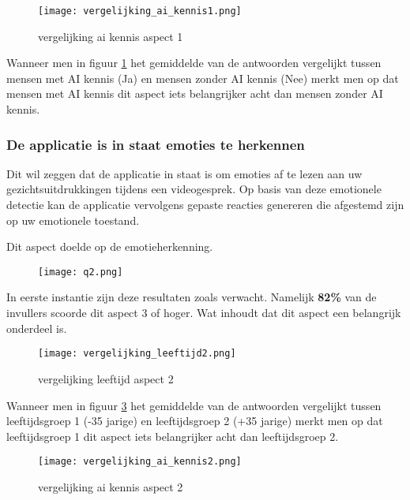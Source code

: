 \begin{figure}[htbp]
    \centering
    \texttt{[image: vergelijking\_ai\_kennis1.png]}
    \caption{vergelijking ai kennis aspect 1}
    \label{fig:vergelijking_ai_kennis1}
\end{figure}

Wanneer men in figuur \ref{fig:vergelijking_ai_kennis1} het gemiddelde van de antwoorden vergelijkt tussen mensen met AI kennis (Ja) en mensen zonder AI kennis (Nee) merkt men op dat mensen met AI kennis dit aspect iets belangrijker acht dan mensen zonder AI kennis.

\newpage

\subsubsection{De applicatie is in staat emoties te herkennen}

Dit wil zeggen  dat de applicatie in staat is om emoties af te lezen aan uw gezichtsuitdrukkingen tijdens een videogesprek. Op basis van deze emotionele detectie kan de applicatie vervolgens gepaste reacties genereren die afgestemd zijn op uw emotionele toestand.

Dit aspect doelde op de emotieherkenning.

\begin{figure}[htbp]
    \centering
    \texttt{[image: q2.png]}
    \label{fig:vraag_2_resultaat}
\end{figure}

In eerste instantie zijn deze resultaten zoals verwacht. Namelijk \textbf{82\%} van de invullers scoorde dit aspect 3 of hoger. Wat inhoudt dat dit aspect een belangrijk onderdeel is.

\begin{figure}[htbp]
    \centering
    \texttt{[image: vergelijking\_leeftijd2.png]}
    \caption{vergelijking leeftijd aspect 2}
    \label{fig:vergelijking_leeftijd2}
\end{figure}

Wanneer men in figuur \ref{fig:vergelijking_leeftijd2} het gemiddelde van de antwoorden vergelijkt tussen leeftijdsgroep 1 (-35 jarige) en leeftijdsgroep 2 (+35 jarige) merkt men op dat leeftijdsgroep 1 dit aspect iets belangrijker acht dan leeftijdsgroep 2.

\begin{figure}[htbp]
    \centering
    \texttt{[image: vergelijking\_ai\_kennis2.png]}
    \caption{vergelijking ai kennis aspect 2}
    \label{fig:vergelijking_ai_kennis2}
\end{figure}

